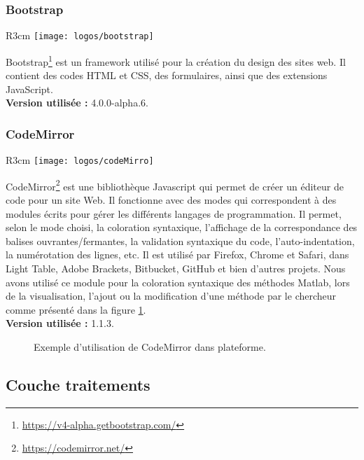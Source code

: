 \subsubsection{Bootstrap }
\begin{wrapfigure}{R}{3cm}	\vspace{-20px}
	\texttt{[image: logos/bootstrap]}
\end{wrapfigure} 
Bootstrap\footnote{\href{https://v4-alpha.getbootstrap.com/}{https://v4-alpha.getbootstrap.com/}} est un framework utilisé pour la création du design des sites web. Il contient des codes HTML et CSS, des formulaires, ainsi que des extensions JavaScript.\\
\textbf{Version utilisée :} 4.0.0-alpha.6.

\subsubsection{CodeMirror}
\begin{wrapfigure}{R}{3cm}	\vspace{-20px}
	\texttt{[image: logos/codeMirro]}
	
\end{wrapfigure} 

CodeMirror\footnote{\href{https://codemirror.net/}{https://codemirror.net/}} est une bibliothèque Javascript qui permet de créer un éditeur de code pour un site Web. Il fonctionne avec des modes qui correspondent à des modules écrits pour gérer les différents langages de programmation. Il permet, selon le mode choisi, la coloration syntaxique, l'affichage de la correspondance des balises ouvrantes/fermantes, la validation syntaxique du code, l'auto-indentation, la numérotation des lignes, etc.
Il est utilisé par Firefox, Chrome et Safari, dans Light Table, Adobe Brackets, Bitbucket, GitHub et bien d'autres projets.
Nous avons utilisé ce module pour la coloration syntaxique des méthodes Matlab, lors de la visualisation, l’ajout ou la modification d’une méthode par le chercheur comme présenté dans la figure \ref{fig:codemirror}.\\
\textbf{Version utilisée :} 1.1.3.

\begin{figure}[H]
	\centering
	\caption{Exemple d'utilisation de CodeMirror dans plateforme.}
	\label{fig:codemirror}
\end{figure}


\subsection{Couche traitements}
